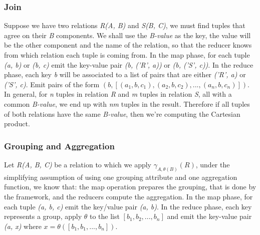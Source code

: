 		\subsubsection{Join}
			\par
			Suppose we have two relations \textit{R(A, B)} and \textit{S(B, C)}, we must find tuples that agree on their \textit{B} components. We shall use the \textit{B-value} as the key, the value will be the other component and the name of the relation, so that the reducer knows from which relation each tuple is coming from.
			\newline
			In the map phase, for each tuple \textit{(a, b)} or \textit{(b, c)} emit the key-value pair \textit{(b, ('R', a))} or \textit{(b, ('S', c))}.
			\newline
			In the reduce phase, each key \textit{b} will be associated to a list of pairs that are either \textit{('R', a)} or \textit{('S', c)}. Emit pairs of the form $(b, [(a_1, b, c_1), (a_2, b, c_2), ..., (a_n, b, c_n)])$.
			\newline
			In general, for \textit{n} tuples in relation \textit{R} and \textit{m} tuples in relation \textit{S}, all with a common \textit{B-value}, we end up with \textit{nm} tuples in the result. Therefore if all tuples of both relations have the same \textit{B-value}, then we're computing the Cartesian product.
		\subsubsection{Grouping and Aggregation}
			\par
			Let \textit{R(A, B, C)} be a relation to which we apply $\gamma_{A, \theta(B)}(R)$, under the simplifying assumption of using one grouping attribute and one aggregation function, we know that: the map operation prepares the grouping, that is done by the framework, and the reducers compute the aggregation.
			\newline
			In the map phase, for each tuple \textit{(a, b, c)} emit the key/value pair \textit{(a, b)}.
			\newline
			In the reduce phase, each key represents a group, apply $\theta$ to the list $[b_1, b_2, ..., b_n]$ and emit the key-value pair \textit{(a, x)} where $x = \theta([b_1, b_1, ..., b_n])$.
	
